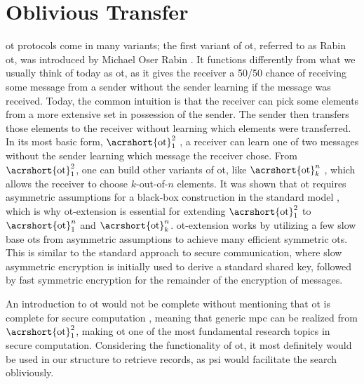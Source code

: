 \section{Oblivious Transfer}
\label{sec:ot}

\acrshort{ot} protocols come in many variants; the first variant of \acrshort{ot}, referred to as Rabin \acrshort{ot}, was introduced by Michael Oser Rabin \cite{EPRINT:Rabin05}. It functions differently from what we usually think of today as \acrshort{ot}, as it gives the receiver a 50/50 chance of receiving some message from a sender without the sender learning if the message was received. Today, the common intuition is that the receiver can pick some elements from a more extensive set in possession of the sender. The sender then transfers those elements to the receiver without learning which elements were transferred. In its most basic form, $\text{\acrshort{ot}}^2_1$ \cite{C:EveGolLem82}, a receiver can learn one of two messages without the sender learning which message the receiver chose. From $\text{\acrshort{ot}}^2_1$, one can build other variants of \acrshort{ot}, like $\text{\acrshort{ot}}^n_k$ \cite{IshaiK97}, which allows the receiver to choose $ k $-out-of-$ n $ elements. It was shown that \acrshort{ot} requires asymmetric assumptions for a black-box construction in the standard model \cite{FOCS:GKMRV00}, which is why \acrshort{ot}-extension \cite{STOC:Beaver96a} is essential for extending $\text{\acrshort{ot}}^2_1$ to $\text{\acrshort{ot}}^n_1$ and $\text{\acrshort{ot}}^n_k$. \acrshort{ot}-extension works by utilizing a few slow base \acrshort{ot}s from asymmetric assumptions to achieve many efficient symmetric \acrshort{ot}s. This is similar to the standard approach to secure communication, where slow asymmetric encryption is initially used to derive a standard shared key, followed by fast symmetric encryption for the remainder of the encryption of messages. 

An introduction to \acrshort{ot} would not be complete without mentioning that \acrshort{ot} is complete for secure computation \cite{STOC:Kilian88}, meaning that generic \acrshort{mpc} can be realized from $\text{\acrshort{ot}}^2_1$, making \acrshort{ot} one of the most fundamental research topics in secure computation. Considering the functionality of \acrshort{ot}, it most definitely would be used in our structure to retrieve records, as \acrshort{psi} would facilitate the search obliviously.


